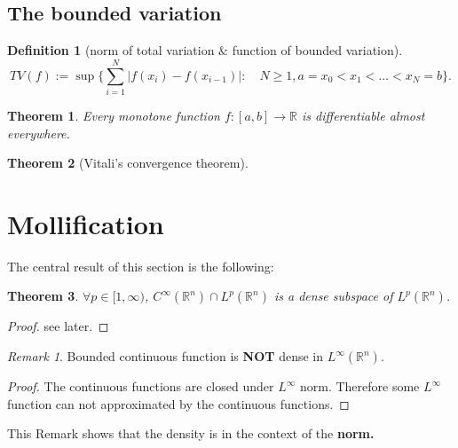 \documentclass[a4paper,11pt,fleqn]{book}
\newtheorem{theorem}{Theorem}[section]
\theoremstyle{definition}
\newtheorem{definition}{Definition}[section]
\theoremstyle{remark}
\newtheorem*{remark}{Remark}
\begin{document}
\subsection{The bounded variation}	
\begin{definition}[norm of total variation $\&$ function of bounded variation]
\begin{equation}
	TV(f):= \sup \bigg\{ \sum_{i = 1}^N |f(x_i) - f(x_{i -1})| : \quad N \ge 1, a = x_0< x_1< \dots<x_N = b \bigg\}. 
\end{equation}
\end{definition}

\begin{theorem}
	Every monotone function $f:[a, b] \rightarrow \mathbb{R}$ is differentiable almost everywhere.
\end{theorem}

\begin{theorem}[Vitali's convergence theorem]
\end{theorem}


\newpage
\section{Mollification}
The central result of this section is the following:
\begin{theorem}
	$\forall p \in [1, \infty)$, $C^\infty(\mathbb{R}^n) \cap L^p(\mathbb{R}^n)$ is a dense subspace of $L^p(\mathbb{R}^n)$.
\end{theorem}
\begin{proof}
see later. 
\end{proof}

\begin{remark}
Bounded continuous function is \textbf{NOT} dense in $L^\infty(\mathbb{R}^n)$.	
\begin{proof}
	The continuous functions are closed under $L^\infty$ norm. Therefore some $L^\infty$ function can not approximated by the continuous functions.
\end{proof}
This Remark shows that the density is in the context of the \textbf{norm.} 
\end{remark}
\end{document}

